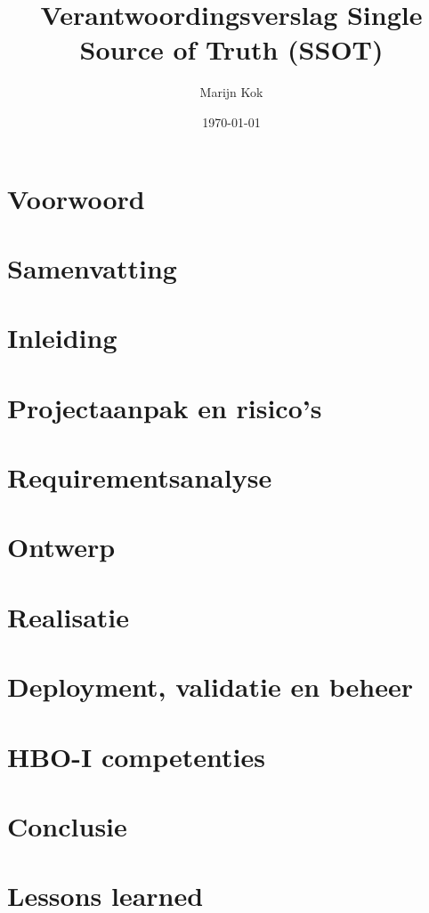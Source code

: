 \documentclass[a4paper, dutch]{report}
\title{Verantwoordingsverslag Single Source of Truth (SSOT)}
\author{Marijn Kok}
\date{\today}
\begin{document}
\maketitle

\chapter*{Voorwoord}
\label{ch:voorwoord}


\chapter*{Samenvatting}


\tableofcontents

\chapter{Inleiding}
\label{ch:introduction}


\chapter{Projectaanpak en risico's}
\label{ch:approach_and_risks}


\chapter{Requirementsanalyse}
\label{ch:requirements}


\chapter{Ontwerp}
\label{ch:design}


\chapter{Realisatie}
\label{ch:realization}


\chapter{Deployment, validatie en beheer}
\label{ch:deployment_validation_management}


\chapter{HBO-I competenties}
\label{ch:skills}


\chapter{Conclusie}
\label{ch:conclusion}


\chapter{Lessons learned}
\label{ch:lessons_learned}


\printbibliography

\appendix

\printglossary[title=Verklarende woordenlijst, toctitle=Verklarende woordenlijst]
\end{document}
